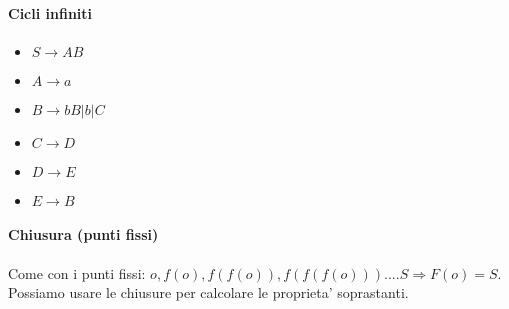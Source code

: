 \paragraph{Cicli infiniti}

\begin{itemize}
  \item $S \rightarrow AB$
  \item $A \rightarrow a$
  \item $B \rightarrow bB|b|C$
  \item $C \rightarrow D$
  \item $D \rightarrow E$
  \item $E \rightarrow B$
\end{itemize}

\paragraph{Chiusura (punti fissi)}

Come con i punti fissi: $o, f(o), f(f(o)), f(f(f(o))) .... S \Rightarrow F(o) = S$.
Possiamo usare le chiusure per calcolare le proprieta' soprastanti.
